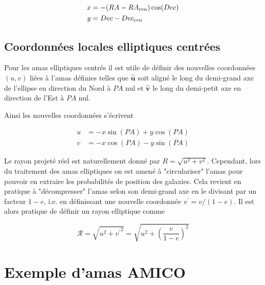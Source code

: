 \documentclass[a4paper,11pt]{article}
\numberwithin{equation}{section}
\begin{document}
    		\begin{align*}
    			x & = - (RA - RA_{\rm{cen}})  \cos( Dec ) \\
    			y & = Dec - Dec_{\rm{cen}}
    		\end{align*}
    		
    	\subsection{Coordonnées locales elliptiques centrées}
    		Pour les amas elliptiques centrés il est utile de définir des nouvelles coordonnées $(u, v)$ liées à l'amas définies telles que $\bm{\hat{u}}$ soit aligné le long du demi-grand axe de l'ellipse en direction du Nord à $PA$ nul et $\bm{\hat{v}}$ le long du demi-petit axe en direction de l'Est à $PA$ nul.\par
    		Ainsi les nouvelles coordonnées s'écrivent
    		
    		\begin{align*}
    			u & = - x \sin (PA) + y \cos (PA) \\
    			v & = -x \cos (PA) - y \sin (PA)
    		\end{align*}
    		
    		Le rayon projeté réel est naturellement donné par $R = \sqrt{u^2 + v^2}$. Cependant, lors du traitement des amas elliptiques on est amené à "circulariser" l'amas pour pouvoir en extraire les probabilités de position des galaxies. Cela revient en pratique à "décompresser" l'amas selon son demi-grand axe en le divisant par un facteur $1-e$, i.e. en définissant une nouvelle coordonnée $v^{'} = v/(1-e)$. Il est alors pratique de définir un rayon elliptique comme
    		
    		\begin{equation}
    			\mathscr{R} = \sqrt{u^2 + {v^{'}}^2} = \sqrt{u^2 + \left ( \frac{v}{1-e} \right ) ^2}
    		\end{equation}
    		



\section{Exemple d'amas AMICO}
  \label{Amas}
\end{document}
